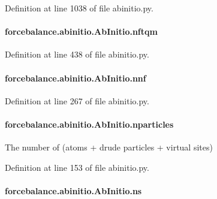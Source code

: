 Definition at line 1038 of file abinitio.\-py.

\hypertarget{classforcebalance_1_1abinitio_1_1AbInitio_a64ae24d7e979723e65358e227b132a4a}{
\paragraph[{nftqm}]{\setlength{\rightskip}{0pt plus 5cm}forcebalance.\-abinitio.\-Ab\-Initio.\-nftqm}}\label{classforcebalance_1_1abinitio_1_1AbInitio_a64ae24d7e979723e65358e227b132a4a}


Definition at line 438 of file abinitio.\-py.

\hypertarget{classforcebalance_1_1abinitio_1_1AbInitio_ac4a5765bf5b089176518f47004fcdb39}{
\paragraph[{nnf}]{\setlength{\rightskip}{0pt plus 5cm}forcebalance.\-abinitio.\-Ab\-Initio.\-nnf}}\label{classforcebalance_1_1abinitio_1_1AbInitio_ac4a5765bf5b089176518f47004fcdb39}


Definition at line 267 of file abinitio.\-py.

\hypertarget{classforcebalance_1_1abinitio_1_1AbInitio_aef3798e4666b91ecc4c526b679eb4908}{
\paragraph[{nparticles}]{\setlength{\rightskip}{0pt plus 5cm}forcebalance.\-abinitio.\-Ab\-Initio.\-nparticles}}\label{classforcebalance_1_1abinitio_1_1AbInitio_aef3798e4666b91ecc4c526b679eb4908}


The number of (atoms + drude particles + virtual sites) 



Definition at line 153 of file abinitio.\-py.

\hypertarget{classforcebalance_1_1abinitio_1_1AbInitio_a1e8248e2efe952362b1b21462a70b540}{
\paragraph[{ns}]{\setlength{\rightskip}{0pt plus 5cm}forcebalance.\-abinitio.\-Ab\-Initio.\-ns}}\label{classforcebalance_1_1abinitio_1_1AbInitio_a1e8248e2efe952362b1b21462a70b540}


